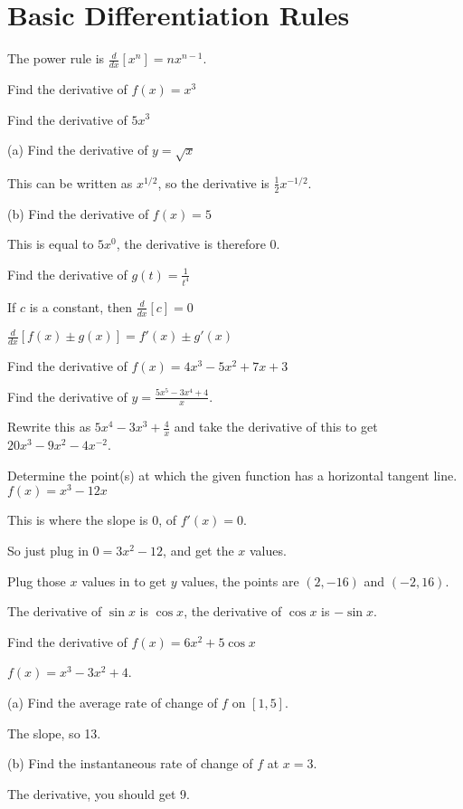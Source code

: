 \documentclass[../bccalc.tex]{subfiles}
\begin{document}
\pagebreak
\section{Basic Differentiation Rules}
The power rule is $\frac{d}{dx}[x^n]=nx^{n-1}$.

\ex Find the derivative of $f(x)=x^3$

\ex Find the derivative of $5x^3$

\begin{example}
    (a) Find the derivative of $y=\sqrt{x}$

    This can be written as $x^{1/2}$, so the derivative is $\frac{1}{2}x^{-1/2}$.

    (b) Find the derivative of $f(x)=5$

    This is equal to $5x^0$, the derivative is therefore 0.
\end{example}

\ex Find the derivative of $g(t)=\frac{1}{t^4}$

If $c$ is a constant, then $\frac{d}{dx}[c]=0$

$\frac{d}{dx}[f(x)\pm g(x)]=f'(x)\pm g'(x)$

\ex Find the derivative of $f(x)=4x^3-5x^2+7x+3$

\begin{example}
    Find the derivative of $y=\frac{5x^5-3x^4+4}{x}$.

    Rewrite this as $5x^4-3x^3+\frac{4}{x}$ and take the derivative of this to get $20x^3-9x^2-4x^{-2}$.
\end{example}

\begin{example}
    Determine the point(s) at which the given function has a horizontal tangent line. $f(x)=x^3-12x$

    This is where the slope is 0, of $f'(x)=0$.

    So just plug in $0=3x^2-12$, and get the $x$ values.

    Plug those $x$ values in to get $y$ values, the points are $(2,-16)$ and $(-2,16)$.
\end{example}

The derivative of $\sin x$ is $\cos x$, the derivative of $\cos x$ is $-\sin x$.

\ex Find the derivative of $f(x)=6x^2+5\cos x$

\begin{example}
    $f(x)=x^3-3x^2+4$.

    (a) Find the average rate of change of $f$ on $[1,5]$.

    The slope, so 13.

    (b) Find the instantaneous rate of change of $f$ at $x=3$.

    The derivative, you should get 9.
\end{example}
\end{document}
